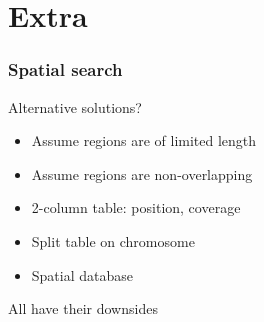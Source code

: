 \documentclass[slidestop]{beamer}
\begin{document}
\section{Extra}
\extrapagetemplate
\begin{frame}
  \frametitle{Spatial search}
  Alternative solutions?
  \begin{itemize}
    \item Assume regions are of limited length
    \item Assume regions are non-overlapping
    \item 2-column table: position, coverage
    \item Split table on chromosome
    \item Spatial database
  \end{itemize}
  \vspace{1cm}
  All have their downsides
\end{frame}
\end{document}
